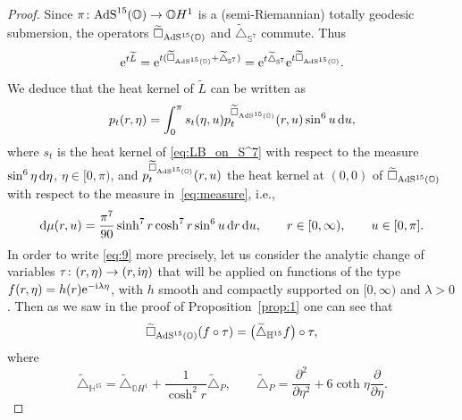 \documentclass[pdftex]{sigma}
\numberwithin{equation}{section}
\begin{document}
\begin{proof}
Since $\pi\colon {\rm AdS}^{15}(\mathbb{O}) \to \mathbb{O}H^1$
is a (semi-Riemannian) totally geodesic submersion, the operators $\widetilde{{\square}}_{{\rm AdS}^{15}(\mathbb{O})}$ and $\widetilde{\triangle}_{\mathbb{S}^7}$ commute. Thus
\begin{equation*}
{\rm e}^{t\widetilde{L}}={\rm e}^{t(\widetilde{\square}_{{\rm AdS}^{15}(\mathbb{O})}+\widetilde{\triangle}_{\mathbb{S}^7})}={\rm e}^{t\widetilde{\triangle}_{\mathbb{S}^7}}{\rm e}^{t\widetilde{\square}_{{\rm AdS}^{15}(\mathbb{O})}}.
\end{equation*}
We deduce that the heat kernel of $\tilde{L}$ can be written as
\begin{equation}\label{eq:9}
p_t(r,\eta)=\int_{0}^{\pi}s_t(\eta,u)p^{\widetilde{\square}_{{\rm AdS}^{15}(\mathbb{O})}}_t(r,u)\sin^6u\,{\rm d}u,
\end{equation}
where $s_t$ is the heat kernel of \eqref{eq:LB_on_S^7} with respect to the measure $\sin^6\eta \, {\rm d}\eta$, $\eta\in [0,\pi)$, and $p^{\widetilde{\square}_{{\rm AdS}^{15}(\mathbb{O})}}_t(r,u)$ the heat kernel at $(0,0)$ of $\widetilde{\square}_{{\rm AdS}^{15}(\mathbb{O})}$ with respect to the measure in~\eqref{eq:measure}, i.e.,
\begin{equation*}
{\rm d}\mu(r,u)=\frac{{\pi}^7}{90}\sinh^7 r\cosh^7 r\sin^6 u \,{\rm d}r\, {\rm d}u, \qquad r\in [0,\infty),\qquad u\in[0,\pi].
\end{equation*}
In order to write \eqref{eq:9} more precisely, let us consider the analytic change of variables $\tau\colon (r,\eta) \rightarrow (r,{\rm i}\eta)$ that will be applied on functions of the type $f(r,\eta)=h(r){\rm e}^{-{\rm i}\lambda \eta}$, with $h$ smooth and compactly supported on $[0,\infty)$ and $\lambda>0$. Then as we saw in the proof of Proposition~\ref{prop:1} one can see that
\begin{equation*}
\widetilde{\square}_{{\rm AdS}^{15}(\mathbb{O})}(f\circ \tau)=\big(\widetilde{\triangle}_{\mathbb{H}^{15}}f\big)\circ \tau,
\end{equation*}
where
\begin{equation*}
\widetilde{\triangle}_{\mathbb{H}^{15}}=\widetilde{\triangle}_{\mathbb{O}H^1}+\frac{1}{\cosh^2 r}\widetilde{\triangle}_{P},\qquad \widetilde{\triangle}_{P}=\frac{{\partial}^2}{\partial {\eta}^2}+6\coth \eta\frac{{\partial}}{\partial {\eta}}.
\end{equation*}


\end{proof}
\end{document}
